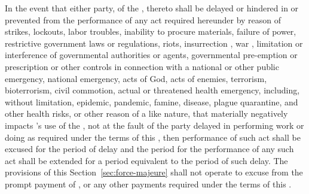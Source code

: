 \label{sec:force-majeure}
In the event that either party, of the \parties, thereto shall be delayed or hindered in or prevented from the performance of any act required hereunder by reason of strikes, lockouts, labor troubles, inability to procure materials, failure of power, restrictive government laws or regulations, riots, insurrection , war , limitation or interference of governmental authorities or agents, governmental pre-emption or prescription or other controls in connection with a national or other public emergency, national emergency, acts of God, acts of enemies, terrorism, bioterrorism, civil commotion, actual or threatened health emergency, including, without limitation, epidemic, pandemic, famine, disease, plague quarantine, and other health risks, or other reason of a like nature, that materially negatively impacts \lessee's use of the \premises, not at the fault of the party delayed in performing work or doing as required under the terms of this \lease, then performance of such act shall be excused for the period of delay and the period for the performance of any such act shall be extended for a period equivalent to the period of such delay. The provisions of this Section~\ref{sec:force-majeure} shall not operate to excuse \lessee from the prompt payment of \monthlyRent, or any other  payments required under the terms of this \lease.
